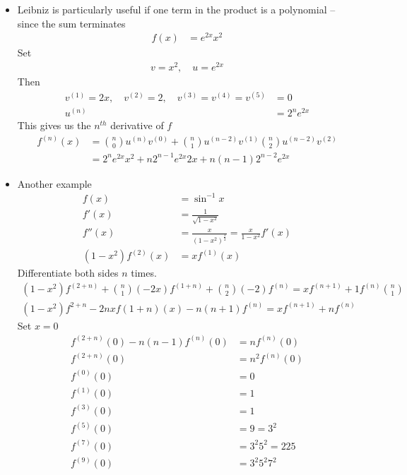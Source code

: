 \begin{ex}
\begin{itemize}
\item
Leibniz is particularly useful if one term in the product is a polynomial -- since the sum terminates
\begin{align*}
f(x) & = e^{2x}x^2 
\end{align*}
Set
\begin{align*}
v= x^2, \quad u = e^{2x} 
\end{align*}
Then
\begin{align*}
v^{(1)} = 2x, \quad v^{(2)} = 2, \quad v^{(3)} = v^{(4)} = v^{(5)} & = 0 \\
u^{(n)} & = 2^n e^{2x}
\end{align*}
This gives us the $n^{th}$ derivative of $f$
\begin{align*}
f^{(n)} (x) & = \binom{n}{0} u^{(n)} v^{(0)} + \binom{n}{1} u^{(n-2)} v^{(1)} \binom{n}{2} u^{(n-2)} v^{(2)} \\ 
& = 2^n e^{2x}  x^2 + n 2^{n-1} e^{2x} 2x   + n(n-1)2^{n-2} e^{2x} 
\end{align*}
\item
Another example
\begin{align*}
f(x) & = \sin^{-1} x \\
f'(x) & = \frac 1 {\sqrt{1-x^2}} \\
f''(x) & = \frac x {(1-x^2)^{\frac 3 2}} = \frac x {1-x^2} f'(x) \\
(1-x^2)f^{(2)}(x) & = x f^{(1)} (x) 
\end{align*}
Differentiate both sides $n$ times.
\begin{align*}
\left( 1-x^2 \right) f^{(2+n)} + \binom n 1 (-2x) f ^{(1+n)} + \binom n 2 (-2) f^{(n)} = xf^{(n+1)} + 1 f^{(n)} \binom{n} 1 \\
\left( 1-x^2 \right) f^{2+n} - 2nx f(1+n)(x) - n (n+1) f^{(n)} = x f^{(n+1)} +  nf^{(n)}
\end{align*}
Set $x=0$
\begin{align*}
f^{(2+n)}(0) - n(n-1)f^{(n)}(0) & = n f^{(n)}(0)  \\
f^{(2+n)}(0) & = n^2 f^{(n)}(0) \\
f^{(0)}(0) & = 0 \\
f^{(1)}(0) & = 1 \\
f^{(3)}(0) & = 1 \\
f^{(5)}(0) & = 9 = 3^2 \\
f^{(7)}(0) & = 3^2 5^2 = 225 \\
f^{(9)}(0) & = 3^2 5^2 7^2
\end{align*}
\end{itemize}
\end{ex}


